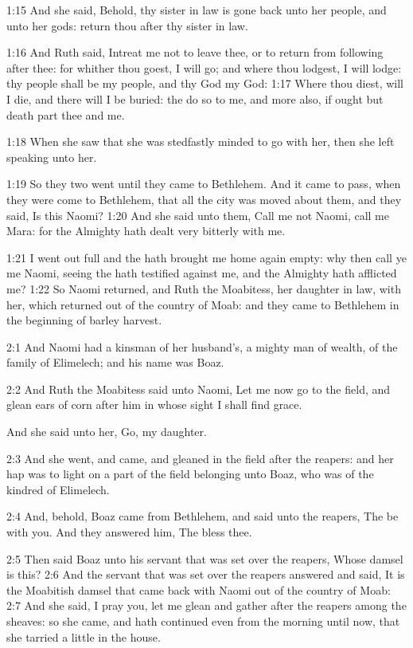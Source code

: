 1:15 And she said, Behold, thy sister in law is gone back unto her people, and unto her gods: return thou after thy sister in law.

1:16 And Ruth said, Intreat me not to leave thee, or to return from following after thee: for whither thou goest, I will go; and where thou lodgest, I will lodge: thy people shall be my people, and thy God my God: 1:17 Where thou diest, will I die, and there will I be buried: the \LORD do so to me, and more also, if ought but death part thee and me.

1:18 When she saw that she was stedfastly minded to go with her, then she left speaking unto her.

1:19 So they two went until they came to Bethlehem. And it came to pass, when they were come to Bethlehem, that all the city was moved about them, and they said, Is this Naomi?  1:20 And she said unto them, Call me not Naomi, call me Mara: for the Almighty hath dealt very bitterly with me.

1:21 I went out full and the \LORD hath brought me home again empty: why then call ye me Naomi, seeing the \LORD hath testified against me, and the Almighty hath afflicted me?  1:22 So Naomi returned, and Ruth the Moabitess, her daughter in law, with her, which returned out of the country of Moab: and they came to Bethlehem in the beginning of barley harvest.

2:1 And Naomi had a kinsman of her husband's, a mighty man of wealth, of the family of Elimelech; and his name was Boaz.

2:2 And Ruth the Moabitess said unto Naomi, Let me now go to the field, and glean ears of corn after him in whose sight I shall find grace.

And she said unto her, Go, my daughter.

2:3 And she went, and came, and gleaned in the field after the reapers: and her hap was to light on a part of the field belonging unto Boaz, who was of the kindred of Elimelech.

2:4 And, behold, Boaz came from Bethlehem, and said unto the reapers, The \LORD be with you. And they answered him, The \LORD bless thee.

2:5 Then said Boaz unto his servant that was set over the reapers, Whose damsel is this?  2:6 And the servant that was set over the reapers answered and said, It is the Moabitish damsel that came back with Naomi out of the country of Moab: 2:7 And she said, I pray you, let me glean and gather after the reapers among the sheaves: so she came, and hath continued even from the morning until now, that she tarried a little in the house.

